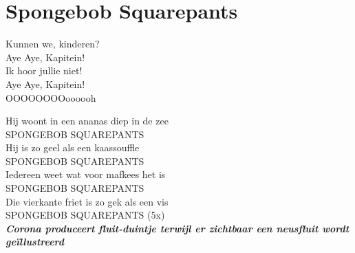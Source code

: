 \section{Spongebob Squarepants}
Kunnen we, kinderen?\\
Aye Aye, Kapitein!\\
Ik hoor jullie niet!\\
Aye Aye, Kapitein!\\
OOOOOOOOoooooh

Hij woont in een ananas diep in de zee\\
SPONGEBOB SQUAREPANTS\\
Hij is zo geel als een kaassouffle\\
SPONGEBOB SQUAREPANTS\\
Iedereen weet wat voor mafkees het is\\
SPONGEBOB SQUAREPANTS\\
Die vierkante friet is zo gek als een vis\\
SPONGEBOB SQUAREPANTS (5x)\\

\textbf{\textit{Corona produceert fluit-duintje terwijl er zichtbaar een neusfluit wordt geïllustreerd}}